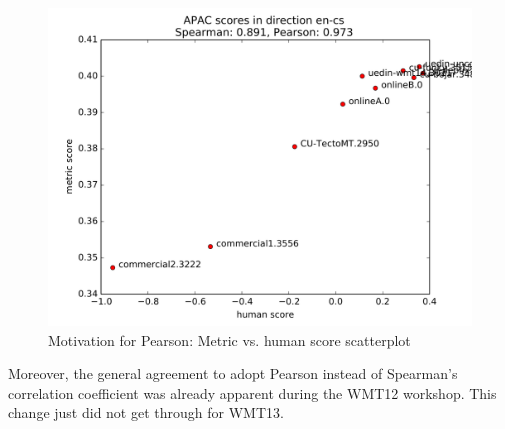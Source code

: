 \begin{figure}
    \begin{center}
        \includegraphics[width=\textwidth]{img/pearson-motivation.pdf}
    \end{center}

    \caption[Motivation for Pearson: Metric vs. human score scatterplot]{
      Motivation for Pearson: Metric vs. human score scatterplot
}

    \label{tree-align}
\end{figure}

Moreover, the general agreement to adopt Pearson instead of Spearman's correlation
coefficient was
already apparent during the WMT12 workshop. This change just did not get
through for WMT13.

